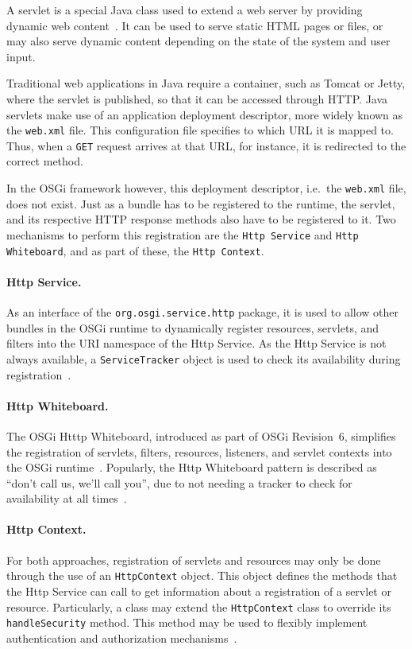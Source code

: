 \documentclass[12pt]{article}
\begin{document}
A servlet is a special Java class used to extend a web server by providing dynamic web content~\cite{servlet}. It can be used to serve static HTML pages or files, or may also serve dynamic content depending on the state of the system and user input.

Traditional web applications in Java require a container, such as Tomcat or Jetty, where the servlet is published, so that it can be accessed through HTTP. Java servlets make use of an application deployment descriptor, more widely known as the \texttt{web.xml} file. This configuration file specifies to which URL it is mapped to. Thus, when a \texttt{GET} request arrives at that URL, for instance, it is redirected to the correct method.

In the OSGi framework however, this deployment descriptor, i.e.\ the \texttt{web.xml} file, does not exist. Just as a bundle has to be registered to the runtime, the servlet, and its respective HTTP response methods also have to be registered to it. Two mechanisms to perform this registration are the \texttt{Http Service} and \texttt{Http Whiteboard}, and as part of these, the \texttt{Http Context}.

\paragraph{Http Service.} As an interface of the \texttt{org.osgi.service.http} package, it is used to allow other bundles in the OSGi runtime to dynamically register resources, servlets, and filters into the URI namespace of the Http Service. As the Http Service is not always available, a \texttt{ServiceTracker} object is used to check its availability during registration~\cite{httpservice}.

\paragraph{Http Whiteboard.} The OSGi Htttp Whiteboard, introduced as part of OSGi Revision~6, simplifies the registration of servlets, filters, resources, listeners, and servlet contexts into the OSGi runtime~\cite{httpwhiteboard_01}. Popularly, the Http Whiteboard pattern is described as ``don't call us, we'll call you'', due to not needing a tracker to check for availability at all times~\cite{httpwhiteboard_02}.

\paragraph{Http Context.} For both approaches, registration of servlets and resources may only be done through the use of an \texttt{HttpContext} object. This object defines the methods that the Http Service can call to get information about a registration of a servlet or resource.  Particularly, a class may extend the \texttt{HttpContext} class to override its \texttt{handleSecurity} method. This method may be used to flexibly implement authentication and authorization mechanisms~\cite{httpcontext}.
\end{document}
